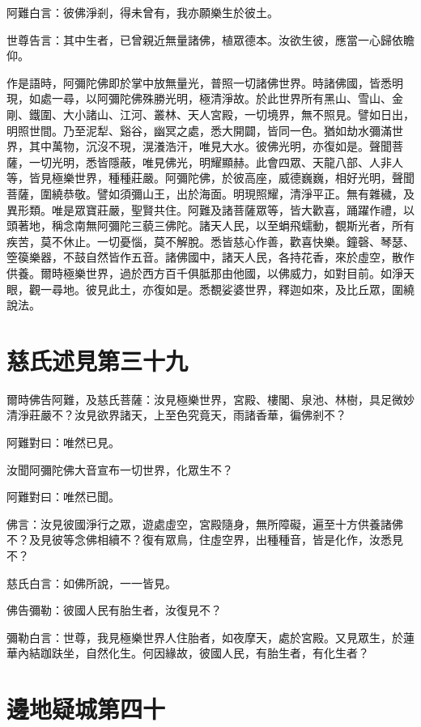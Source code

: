 \documentclass{zhvt-classic}
\begin{document}
阿難白言：彼佛淨剎，得未曾有，我亦願樂生於彼土。

世尊告言：其中生者，已曾親近無量諸佛，植眾德本。汝欲生彼，應當一心歸依瞻仰。

作是語時，阿彌陀佛即於掌中放無量光，普照一切諸佛世界。時諸佛國，皆悉明現，如處一尋，以阿彌陀佛殊勝光明，極清淨故。於此世界所有黑山、雪山、金剛、鐵圍、大小諸山、江河、叢林、天人宮殿，一切境界，無不照見。譬如日出，明照世間。乃至泥犁、谿谷，幽冥之處，悉大開闢，皆同一色。猶如劫水彌滿世界，其中萬物，沉沒不現，滉瀁浩汗，唯見大水。彼佛光明，亦復如是。聲聞菩薩，一切光明，悉皆隱蔽，唯見佛光，明耀顯赫。此會四眾、天龍八部、人非人等，皆見極樂世界，種種莊嚴。阿彌陀佛，於彼高座，威德巍巍，相好光明，聲聞菩薩，圍繞恭敬。譬如須彌山王，出於海面。明現照耀，清淨平正。無有雜穢，及異形類。唯是眾寶莊嚴，聖賢共住。阿難及諸菩薩眾等，皆大歡喜，踊躍作禮，以頭著地，稱念南無阿彌陀三藐三佛陀。諸天人民，以至蜎飛蠕動，覩斯光者，所有疾苦，莫不休止。一切憂惱，莫不解脫。悉皆慈心作善，歡喜快樂。鐘磬、琴瑟、箜篌樂器，不鼓自然皆作五音。諸佛國中，諸天人民，各持花香，來於虛空，散作供養。爾時極樂世界，過於西方百千俱胝那由他國，以佛威力，如對目前。如淨天眼，觀一尋地。彼見此土，亦復如是。悉覩娑婆世界，釋迦如來，及比丘眾，圍繞說法。

\chapter*{慈氏述見第三十九}

爾時佛告阿難，及慈氏菩薩：汝見極樂世界，宮殿、樓閣、泉池、林樹，具足微妙清淨莊嚴不？汝見欲界諸天，上至色究竟天，雨諸香華，徧佛剎不？

阿難對曰：唯然已見。

汝聞阿彌陀佛大音宣布一切世界，化眾生不？

阿難對曰：唯然已聞。

佛言：汝見彼國淨行之眾，遊處虛空，宮殿隨身，無所障礙，遍至十方供養諸佛不？及見彼等念佛相續不？復有眾鳥，住虛空界，出種種音，皆是化作，汝悉見不？

慈氏白言：如佛所說，一一皆見。

佛告彌勒：彼國人民有胎生者，汝復見不？

彌勒白言：世尊，我見極樂世界人住胎者，如夜摩天，處於宮殿。又見眾生，於蓮華內結跏趺坐，自然化生。何因緣故，彼國人民，有胎生者，有化生者？

\chapter*{邊地疑城第四十}
\end{document}
